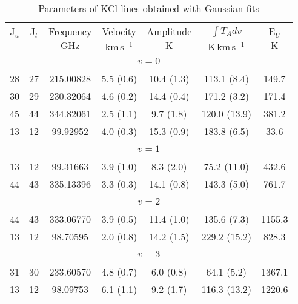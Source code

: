 \begin{table*}[htp]
\centering
\caption{Parameters of KCl lines obtained with Gaussian fits}
\begin{tabular}{ccccccc}
\label{tab:KCl_salt_lines}
 J$_u$ & J$_l$ & Frequency & Velocity & Amplitude & $\int T_A dv$ & E$_U$ \\
  &  & $\mathrm{GHz}$ & $\mathrm{km\,s^{-1}}$ & $\mathrm{K}$ & $\mathrm{K\,km\,s^{-1}}$ & $\mathrm{K}$ \\
\hline
&\vspace{-0.75em}\\
\multicolumn{7}{c}{$v = 0$} \\
\vspace{-0.75em}\\
 28 & 27 & 215.00828 & 5.5 (0.6) & 10.4 (1.3) & 113.1 (8.4) & 149.7 \\
 30 & 29 & 230.32064 & 4.6 (0.2) & 14.4 (0.4) & 171.2 (3.2) & 171.4 \\
 45 & 44 & 344.82061 & 2.5 (1.1) & 9.7 (1.8) & 120.0 (13.9) & 381.2 \\
 13 & 12 & 99.92952 & 4.0 (0.3) & 15.3 (0.9) & 183.8 (6.5) & 33.6 \\
&\vspace{-0.75em}\\
\multicolumn{7}{c}{$v = 1$} \\
\vspace{-0.75em}\\
 13 & 12 & 99.31663 & 3.9 (1.0) & 8.3 (2.0) & 75.2 (11.0) & 432.6 \\
 44 & 43 & 335.13396 & 3.3 (0.3) & 14.1 (0.8) & 143.3 (5.0) & 761.7 \\
&\vspace{-0.75em}\\
\multicolumn{7}{c}{$v = 2$} \\
\vspace{-0.75em}\\
 44 & 43 & 333.06770 & 3.9 (0.5) & 11.4 (1.0) & 135.6 (7.3) & 1155.3 \\
 13 & 12 & 98.70595 & 2.0 (0.8) & 14.2 (1.5) & 229.2 (15.2) & 828.3 \\
&\vspace{-0.75em}\\
\multicolumn{7}{c}{$v = 3$} \\
\vspace{-0.75em}\\
 31 & 30 & 233.60570 & 4.8 (0.7) & 6.0 (0.8) & 64.1 (5.2) & 1367.1 \\
 13 & 12 & 98.09753 & 6.1 (1.1) & 9.2 (1.7) & 116.3 (13.2) & 1220.6 \\

\end{tabular}
\end{table*}
